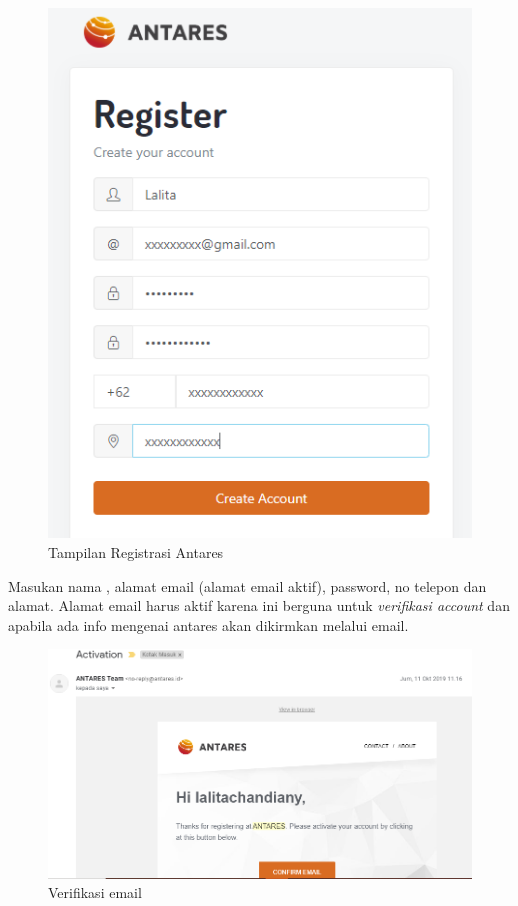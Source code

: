 \begin{enumerate}
\begin{figure}[H]
    \includegraphics[width=1\textwidth]{figures/antares3.png}
    \caption{Tampilan Registrasi Antares}
    \label{print}
    \end{figure}
    \par Masukan nama , alamat email (alamat email aktif), password, no telepon dan alamat. Alamat email harus aktif karena ini berguna untuk \textit{verifikasi account} dan apabila ada info mengenai antares akan dikirmkan melalui email. 
    
    \begin{figure}[H]
    \centering
    \includegraphics[width=1\textwidth]{figures/antares4.png}
    \caption{Verifikasi email}
    \label{print}
    \end{figure}
    

\end{enumerate}
